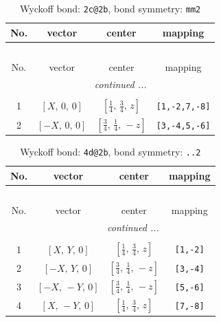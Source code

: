 \documentclass[fleqn,8pt]{jsarticle}
\begin{document}
\begin{longtable}{cccc}
\caption{Wyckoff bond: {\tt 2c@2b}, bond symmetry: {\tt mm2}}
 \\
 \hline \hline
No. & vector & center & mapping \\ \hline \endfirsthead

\multicolumn{3}{l}{\tablename\ \thetable{}} \\
 \hline \hline
No. & vector & center & mapping \\ \hline \endhead

 \hline \hline
\multicolumn{3}{r}{\footnotesize\it continued ...} \\ \endfoot

 \hline \hline
\multicolumn{3}{r}{} \\ \endlastfoot

1 & $\left[ X,\, 0,\, 0 \right]$ & $\left[ \frac{1}{4},\, \frac{3}{4},\, z \right]$ & {\tt [1,-2,7,-8]} \\ \hline
2 & $\left[ - X,\, 0,\, 0 \right]$ & $\left[ \frac{3}{4},\, \frac{1}{4},\, - z \right]$ & {\tt [3,-4,5,-6]} \\
\end{longtable}
\renewcommand{\arraystretch}{1.2}
\begin{longtable}{cccc}
\caption{Wyckoff bond: {\tt 4d@2b}, bond symmetry: {\tt ..2}}
 \\
 \hline \hline
No. & vector & center & mapping \\ \hline \endfirsthead

\multicolumn{3}{l}{\tablename\ \thetable{}} \\
 \hline \hline
No. & vector & center & mapping \\ \hline \endhead

 \hline \hline
\multicolumn{3}{r}{\footnotesize\it continued ...} \\ \endfoot

 \hline \hline
\multicolumn{3}{r}{} \\ \endlastfoot

1 & $\left[ X,\, Y,\, 0 \right]$ & $\left[ \frac{1}{4},\, \frac{3}{4},\, z \right]$ & {\tt [1,-2]} \\ \hline
2 & $\left[ - X,\, Y,\, 0 \right]$ & $\left[ \frac{3}{4},\, \frac{1}{4},\, - z \right]$ & {\tt [3,-4]} \\ \hline
3 & $\left[ - X,\, - Y,\, 0 \right]$ & $\left[ \frac{3}{4},\, \frac{1}{4},\, - z \right]$ & {\tt [5,-6]} \\ \hline
4 & $\left[ X,\, - Y,\, 0 \right]$ & $\left[ \frac{1}{4},\, \frac{3}{4},\, z \right]$ & {\tt [7,-8]} \\
\end{longtable}
\end{document}
